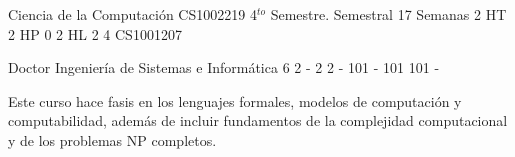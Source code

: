 \documentclass[a4paper,8pt]{article}
\begin{document}
\setNombreProfesor{}
\setGradoProfesorAbreviado{}
\sylabusHeader

\academicaTable
{Ciencia de la Computación} %
{CS1002219} %
{4$^{to}$ Semestre.} %
{Semestral} %
{17 Semanas} %
{2 HT} %
{2 HP} %
{0} %
{2 HL}  %
{2} %
{4} %
{CS1001207} %

\administrativaTable
{Doctor} %
{Ingeniería de Sistemas e Informática} %
{6} %
{2} %
{-} %
{2} %
{2} %
{-} %
{101} %
{-} %
{101} %
{101} %
{-} %


\begin{fundamentacion}
Este curso hace fasis en los lenguajes formales, modelos de computación y computabilidad, además de incluir fundamentos de la complejidad computacional y de los problemas NP completos.

\end{fundamentacion}

\begin{sumilla}
\item \ALBasicAutomataComputabilityandComplexity
\item \ALAdvancedComputationalComplexity
\item \ALAdvancedAutomataTheoryandComputability

\end{sumilla}

\begin{competenciasAsignatura}
\item {}
\item {}

\end{competenciasAsignatura}
\end{document}
